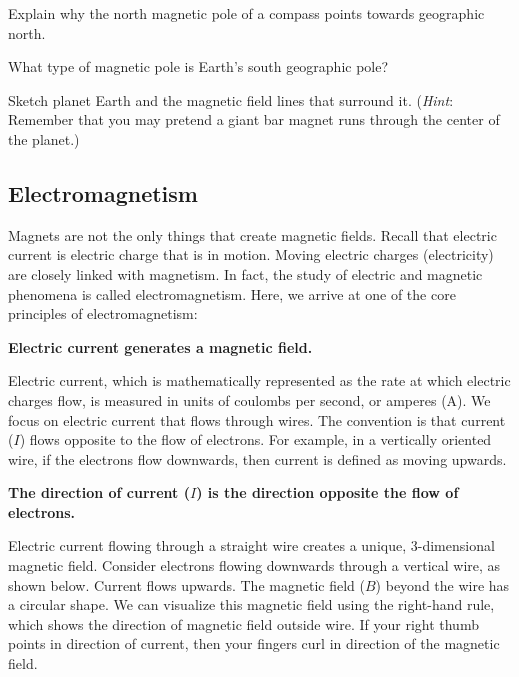 \documentclass[main.tex]{subfiles}
\begin{document}
\begin{exercise}
    Explain why the north magnetic pole of a compass points towards geographic north. 
\end{exercise}

\begin{exercise}
    What type of magnetic pole is Earth's south geographic pole?
\end{exercise}

\begin{exercise}
    Sketch planet Earth and the magnetic field lines that surround it. (\textit{Hint}: Remember that you may pretend a giant bar magnet runs through the center of the planet.) 
\end{exercise}

\clearpage
\subsection{Electromagnetism} \label{okuZoJ}


Magnets are not the only things that create magnetic fields. Recall that electric current is electric charge that is in motion. Moving electric charges (electricity) are closely linked with magnetism. In fact, the study of electric and magnetic phenomena is called \gls{electromagnetism}. Here, we arrive at one of the core principles of electromagnetism:

\begin{mdframed}[backgroundcolor=black!10]
    \centering
    \textbf{Electric current generates a magnetic field.}
\end{mdframed}



Electric current, which is mathematically represented as the rate at which electric charges flow, is measured in units of coulombs per second, or amperes (A). We focus on electric current that flows through wires. The convention is that current ($I$) flows opposite to the flow of electrons. For example, in a vertically oriented wire, if the electrons flow downwards, then current is defined as moving upwards.

\begin{mdframed}[backgroundcolor=black!10]
    \centering
    \textbf{The direction of current ($I$) is the direction opposite the flow of electrons.}
\end{mdframed}

Electric current flowing through a straight wire creates a unique, 3-dimensional magnetic field. Consider electrons flowing downwards through a vertical wire, as shown below. Current flows upwards. The magnetic field ($B$) beyond the wire has a circular shape. We can visualize this magnetic field using the \gls{right-hand rule}, which shows the direction of magnetic field outside wire. If your right thumb points in direction of current, then your fingers curl in direction of the magnetic field. 
\end{document}
